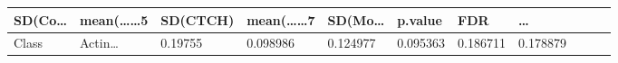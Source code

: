 \documentclass[
]{article}
\begin{document}
\begin{longtable}[]{@{}lllllllllll@{}}
\begin{minipage}[b]{0.06\columnwidth}
SD(Co\ldots{}\strut
\end{minipage} & \begin{minipage}[b]{0.09\columnwidth}\raggedright
mean(\ldots\ldots5\strut
\end{minipage} & \begin{minipage}[b]{0.06\columnwidth}\raggedright
SD(CTCH)\strut
\end{minipage} & \begin{minipage}[b]{0.09\columnwidth}\raggedright
mean(\ldots\ldots7\strut
\end{minipage} & \begin{minipage}[b]{0.06\columnwidth}\raggedright
SD(Mo\ldots{}\strut
\end{minipage} & \begin{minipage}[b]{0.06\columnwidth}\raggedright
p.value\strut
\end{minipage} & \begin{minipage}[b]{0.06\columnwidth}\raggedright
FDR\strut
\end{minipage} & \begin{minipage}[b]{0.03\columnwidth}\raggedright
\ldots{}\strut
\end{minipage}\tabularnewline
\midrule
\endhead
\begin{minipage}[t]{0.06\columnwidth}\raggedright
Class\strut
\end{minipage} & \begin{minipage}[t]{0.06\columnwidth}\raggedright
Actin\ldots{}\strut
\end{minipage} & \begin{minipage}[t]{0.09\columnwidth}\raggedright
0.19755\strut
\end{minipage} & \begin{minipage}[t]{0.06\columnwidth}\raggedright
0.098986\strut
\end{minipage} & \begin{minipage}[t]{0.09\columnwidth}\raggedright
0.124977\strut
\end{minipage} & \begin{minipage}[t]{0.06\columnwidth}\raggedright
0.095363\strut
\end{minipage} & \begin{minipage}[t]{0.09\columnwidth}\raggedright
0.186711\strut
\end{minipage} & \begin{minipage}[t]{0.06\columnwidth}\raggedright
0.178879\strut
\end{minipage} & \begin{minipage}[t]{0.06\columnwidth}\raggedright

\end{minipage}
\end{longtable}
\end{document}
